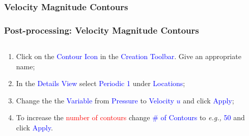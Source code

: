 \documentclass[10pt,compress, unknownkeysallowed]{beamer}
\newcommand{\red}{\textcolor{red}}
\newcommand{\blue}{\textcolor{blue}}
\newcommand{\eg}{{\it e.g., }}
\begin{document}
\subsubsection{Velocity Magnitude Contours}
\begin{frame}
  \frametitle{Post-processing: Velocity Magnitude Contours}
    \begin{columns}
        \begin{column}[l]{0.5\linewidth}
           \begin{enumerate}\scriptsize%
                \item<1-> Click on the \blue{Contour Icon} in the \blue{Creation Toolbar}. Give an appropriate name;
                \item<1-> In the \blue{Details View} select \blue{Periodic 1} under \blue{Locations};
                \item<1-> Change the the \blue{Variable} from \blue{Pressure} to \blue{Velocity $u$} and click \blue{Apply};
                \item<1-> To increase the \red{number of contours} change \blue{$\#$ of Contours} to \eg \blue{50} and click \blue{Apply}.                 
           \end{enumerate}           
        \end{column}
        \begin{column}[l]{0.5\linewidth}
        \end{column}
    \end{columns}
\end{frame}
\end{document}
